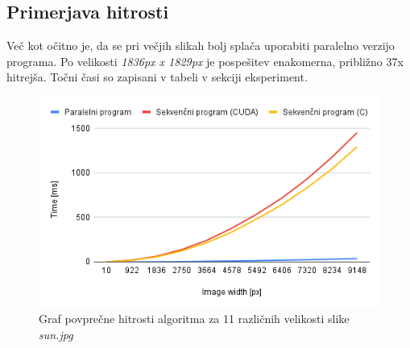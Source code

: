 \documentclass{article}
\begin{document}
\subsection{Primerjava hitrosti}
Več kot očitno je, da se pri večjih slikah bolj splača uporabiti paralelno verzijo programa. Po velikosti \textit{1836px x 1829px} je pospešitev enakomerna, približno 37x hitrejša. Točni časi so zapisani v tabeli v sekciji eksperiment.
\begin{figure}[!h]
    \centering
    \includegraphics[width=1\linewidth]{images/chart.png}
    \caption{Graf povprečne hitrosti algoritma za 11 različnih velikosti slike \textit{sun.jpg}}
\end{figure}
\clearpage
\end{document}

